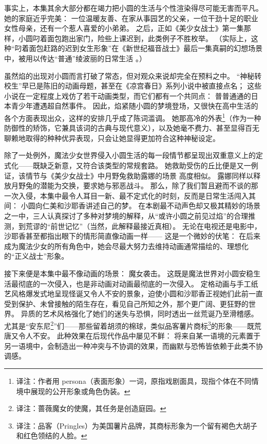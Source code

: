 事实上，本集其余大部分都在竭力把小圆的生活与个性渲染得尽可能无害而平凡。
她的家庭近乎完美：
一位温暖友善、在家从事园艺的父亲，一位干劲十足的职业女性母亲，还有一个惹人喜爱的小弟弟。
之后，正如《美少女战士》第一集那样，小圆叼着面包跑出家门，险些上课迟到，此类例子不胜枚举。
（实际上，这种“叼着面包赶路的迟到女生形象”在《新世纪福音战士》最后一集真嗣的幻想场景中，被用以传达“普通”绫波丽的日常生活
\cite{evangelion-episode26-2005}。）

虽然焰的出现对小圆而言打破了常态，但对观众来说却完全在预料之中。
“神秘转校生”早已是陈旧的动画母题，甚至在《凉宫春日》系列小说中被直接点名\cite{tanigawa2009haruhi}；
这些小说在一定程度上戏仿了若干动画类型，而它们都有一个共同点：
普普通通的日本青少年遭遇超自然事件。
因此，焰紧随小圆的梦境登场，又很快在高中生活的各个方面表现出众，这样的安排几乎成了陈词滥调。
她那高冷的外表\footnote{%
    译注：作者用 persona（表面形象）一词，原指戏剧面具，现指个体在不同情境中展现的公开形象或角色伪装。
}（作为一种防御性的矫饰，它兼具该词的古典与现代意义），以及她毫不费力、甚至显得百无聊赖地取得的种种优异表现，只会让她显得更加符合这种神秘设定。

除了一处例外，魔法少女世界侵入小圆生活的每一段情节都呈现出双重意义上的定式化——既缺乏新意，又符合该类型的常规套路。
她救助受伤的丘比便是又一例证，该情节与《美少女战士》中月野兔救助露娜的场景
\cite{sailor-moon-episode1-2014}高度相似。
露娜同样以释放月野兔的潜能为交换，要求她与邪恶战斗。
那么，除了我们暂且避而不谈的那一次入侵，本集中最令人耳目一新、最不定式化的时刻，反而是日常生活闯入其间：
小圆向仁美和沙耶香讲述自己的梦。
在本剧最不动声色却又极其精妙的场景之一中，三人认真探讨了多种对梦境的解释，从“或许小圆之前见过焰”的合理推测，到荒谬的“前世记忆”（当然，此解释最接近真相）。
无论在电视还是电影中，沙耶香甚至都指出眼下的情形简直像动画一样——
这是一个微妙的伏笔：
在后来成为魔法少女的所有角色中，她会尽最大努力去维持动画通常描绘的、理想化的“正义战士”形象。

接下来便是本集中最不像动画的场景：
魔女袭击。
这既是魔法世界对小圆安稳生活最彻底的一次侵入，也是非动画对动画最彻底的一次侵入。
定格动画与手工纸艺风格爆发式地呈现怪诞又令人不安的景象，迫使小圆和沙耶香正视她们此前一直受到保护、未曾接触的陌生存在，看见自己所知之外，那个更广阔、更狂野的世界。
异质的艺术风格强化了她们的迷失与恐惧，同时透出一丝荒诞乃至滑稽感。
尤其是“安东尼\footnote{%
    译注：蔷薇魔女的使魔，其任务是创造庭园。
}”们——那些留着胡须的棉球，类似品客薯片商标\footnote{%
    译注：品客（Pringles）为美国薯片品牌，其商标形象为一个留有褐色大胡子和红色领结的人脸。
}的形象——既荒唐又令人不安。
此种效果在后现代作品中屡见不鲜：
将来自某一语境的元素置于另一语境中，会制造出一种冲突与不协调的效果\cite{hassan1987pluralism}，而幽默\cite{boyd2004laughter-literature}与恐怖\cite{carroll1999horror-humor}皆依赖于此类不协调感。

